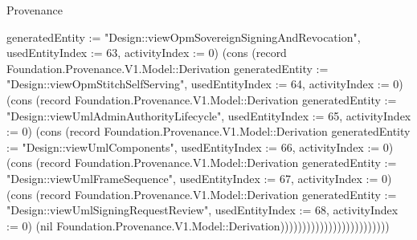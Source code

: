 \begin{lexlean}{Provenance}
\begin{semanticmodule}
{{generatedEntity := "Design::viewOpmSovereignSigningAndRevocation", usedEntityIndex := 63, activityIndex := 0}) (cons (record Foundation.Provenance.V1.Model::Derivation {generatedEntity := "Design::viewOpmStitchSelfServing", usedEntityIndex := 64, activityIndex := 0}) (cons (record Foundation.Provenance.V1.Model::Derivation {generatedEntity := "Design::viewUmlAdminAuthorityLifecycle", usedEntityIndex := 65, activityIndex := 0}) (cons (record Foundation.Provenance.V1.Model::Derivation {generatedEntity := "Design::viewUmlComponents", usedEntityIndex := 66, activityIndex := 0}) (cons (record Foundation.Provenance.V1.Model::Derivation {generatedEntity := "Design::viewUmlFrameSequence", usedEntityIndex := 67, activityIndex := 0}) (cons (record Foundation.Provenance.V1.Model::Derivation {generatedEntity := "Design::viewUmlSigningRequestReview", usedEntityIndex := 68, activityIndex := 0}) (nil Foundation.Provenance.V1.Model::Derivation)))))))))))))))))))))))))
}


\end{semanticmodule}
\end{lexlean}
